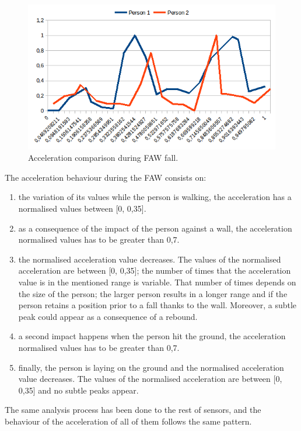 \documentclass[conference]{IEEEtran}
\theoremstyle{definition}
\begin{document}
\begin{figure}[!h]
  \centering
  \includegraphics[scale=0.35]{img/FAWComparison.png}
  \caption[Acceleration during FAW fall]{Acceleration comparison during FAW fall.}
  \label{fig:FAWcomparison}
\end{figure}

The acceleration behaviour during the FAW consists on:
\begin{enumerate}
 \item the variation of its values while the person is walking, the acceleration has a normalised values 
 between [0, 0,35].
 \item as a consequence of the impact of the person against a wall, the acceleration normalised values 
 has to be greater than 0,7.
 \item the normalised acceleration value decreases. The values of the normalised acceleration are between 
 [0, 0,35]; the number of times that the acceleration value is in the mentioned range is variable. That 
 number of times depends on the size of the person; the larger person results in a longer range and if the 
 person retains a position prior to a fall thanks to the wall. Moreover, a subtle peak could appear as a 
 consequence of a rebound.
 \item a second impact happens when the person hit the ground, the acceleration normalised values has to 
 be greater than 0,7.
 \item finally, the person is laying on the ground and the normalised acceleration value decreases. The 
 values of the normalised acceleration are between [0, 0,35] and no subtle peaks appear. 
\end{enumerate}

The same analysis process has been done to the rest of sensors, and the behaviour of the acceleration of all of them follows the same pattern.
\end{document}
